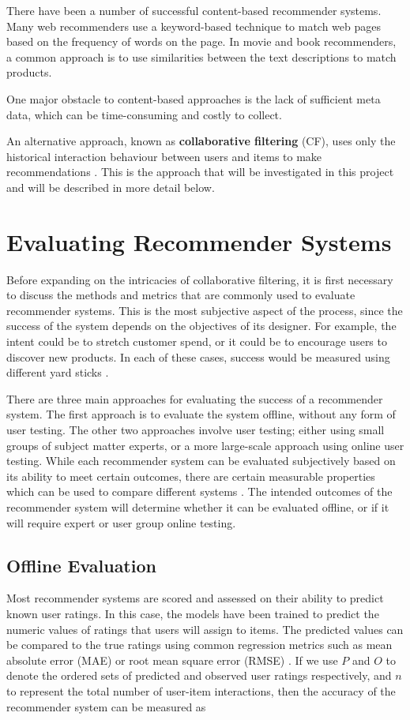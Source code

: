 There have been a number of successful content-based recommender systems. Many web recommenders use a keyword-based technique to match web pages based on the frequency of words on the page. In movie and book recommenders, a common approach is to use similarities between the text descriptions to match products. \parencite{handbook_1.3_content-based}

One major obstacle to content-based approaches is the lack of sufficient meta data, which can be time-consuming and costly to collect. \parencite{cf_1.6_implicit}

An alternative approach, known as \textbf{collaborative filtering} (CF), uses only the historical interaction behaviour between users and items to make recommendations \parencite{cf_1.1}. This is the approach that will be investigated in this project and will be described in more detail below.

\section{Evaluating Recommender Systems}
Before expanding on the intricacies of collaborative filtering, it is first necessary to discuss the methods and metrics that are commonly used to evaluate recommender systems. This is the most subjective aspect of the process, since the success of the system depends on the objectives of its designer. For example, the intent could be to stretch customer spend, or it could be to encourage users to discover new products. In each of these cases, success would be measured using different yard sticks \parencite{eval_colab}.

There are three main approaches for evaluating the success of a recommender system. The first approach is to evaluate the system offline, without any form of user testing. The other two approaches involve user testing; either using small groups of subject matter experts, or a more large-scale approach using online user testing. While each recommender system can be evaluated subjectively based on its ability to meet certain outcomes, there are certain measurable properties which can be used to compare different systems \parencite{handbook_1.8_evaluation}. The intended outcomes of the recommender system will determine whether it can be evaluated offline, or if it will require expert or user group online testing.

\subsection{Offline Evaluation}
Most recommender systems are scored and assessed on their ability to predict known user ratings. In this case, the models have been trained to predict the numeric values of ratings that users will assign to items. The predicted values can be compared to the true ratings using common regression metrics such as mean absolute error (MAE) or root mean square error (RMSE) \parencite{eval_coverage}. If we use $P$ and $O$ to denote the ordered sets of predicted and observed user ratings respectively, and $n$ to represent the total number of user-item interactions, then the accuracy of the recommender system can be measured as

